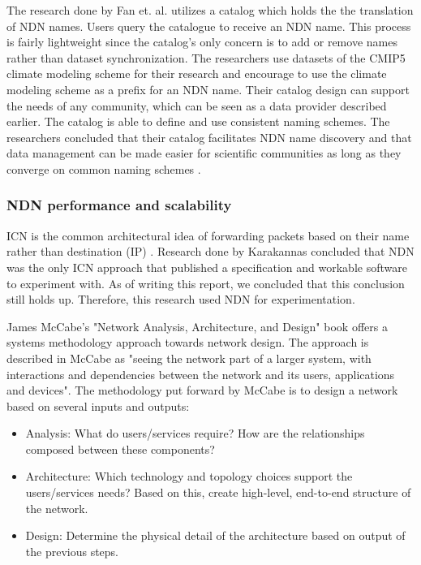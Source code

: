 The research done by Fan et. al. utilizes a catalog which holds the the translation of NDN names. Users query the catalogue to receive an NDN name. This process is fairly lightweight since the catalog's only concern is to add or remove names rather than dataset synchronization. The researchers use datasets of the CMIP5 climate modeling scheme for their research and encourage to use the climate modeling scheme as a prefix for an NDN name. 
Their catalog design can support the needs of any community, which can be seen as a data provider described earlier. The catalog is able to define and use consistent naming schemes.
The researchers concluded that their catalog facilitates NDN name discovery and that data management can be made easier for scientific communities as long as they converge on common naming schemes \cite{ndn-man}. 

\subsubsection{NDN performance and scalability}
\label{introduction-related-work-ndn}
ICN is the common architectural idea of forwarding packets based on their name rather than destination (IP) \cite{jacobson2009networking}. Research done by Karakannas \cite{icn-bd} concluded that NDN was the only ICN approach that published a specification and workable software to experiment with. As of writing this report, we concluded that this conclusion still holds up. Therefore, this research used NDN for experimentation.

James McCabe's "Network Analysis, Architecture, and Design" \cite{mccabe2010network} book offers a systems methodology approach towards network design. The approach is described in McCabe as "seeing the network part of a larger system, with interactions and dependencies between the network and its users, applications and devices". The methodology put forward by McCabe is to design a network based on several inputs and outputs:
\begin{itemize}
    \item Analysis: What do users/services require? How are the relationships composed between these components?
    \item Architecture: Which technology and topology choices support the users/services needs? Based on this, create high-level, end-to-end structure of the network.
    \item Design: Determine the physical detail of the architecture based on output of the previous steps.
\end{itemize}

